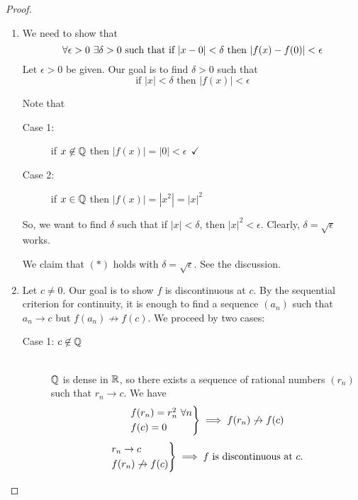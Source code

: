 \begin{proof}
    \begin{enumerate}[$(i)$]
        \item We need to show that 
        $$\forall \epsilon > 0 ~\exists \delta > 0 \text{ such that } \text{if $|x-0| < \delta$ then $|f(x) - f(0)|< \epsilon$}$$
        Let $\epsilon > 0$ be given. Our goal is to find $\delta > 0$ such that
        \begin{equation*}
            \text{if $|x| < \delta$ then $|f(x)| < \epsilon$} \tag{$*$}
        \end{equation*}
        \begin{info}
            Note that
            \begin{description}
                \item[Case 1: ] if $x\not \in \mathbb{Q}$ then $|f(x)|=|0| < \epsilon ~~\checkmark$
                \item[Case 2: ] if $x \in \mathbb{Q}$ then $|f(x)|=|x^2|=|x|^2$
            \end{description}
            So, we want to find $\delta$ such that if $|x| < \delta$, then $|x|^2 < \epsilon$. Clearly, $\delta = \sqrt{\epsilon}$ works.
        \end{info}
        We claim that $(*)$ holds with $\delta = \sqrt{\epsilon}.$ See the discussion.

        \item Let $c \not = 0$. Our goal is to show $f$ is discontinuous at $c$. By the sequential criterion for continuity, it is enough to find a sequence $(a_n)$ such that $a_n \to c$ but $f(a_n) \not \to f(c)$. We proceed by two cases:
        \begin{description}
            \item[Case 1: $c \not \in \mathbb{Q}$] \leavevmode \\
            $\mathbb{Q}$ is dense in $\mathbb{R}$, so there exists a sequence of rational numbers $(r_n)$ such that $r_n \to c.$ We have
            $$
            \begin{rcases*}
                f(r_n) = r_n ^2 ~\forall n \\
                f(c) = 0
            \end{rcases*} \implies f(r_n) \not \to f(c)
            $$
            $$
            \begin{rcases*}
                r_n \to c \\
                f(r_n) \not \to f(c)
            \end{rcases*} \implies f \text{ is discontinuous at } c.
            $$
        \end{description}


\end{enumerate}
\end{proof}

